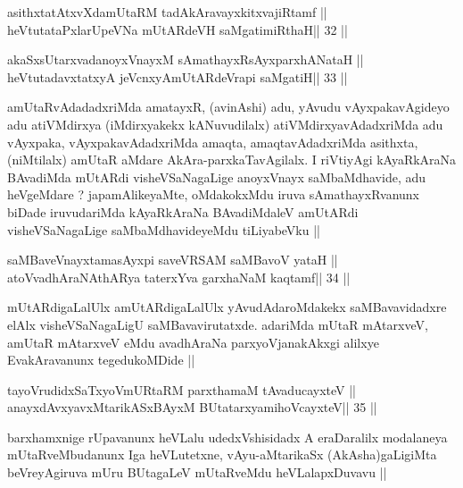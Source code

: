 \begin{shl}
asithxtatAtxvXdamUtaRM tadAkAravayxkitxvajiRtamf ||
heVtutataPxlarUpeVNa mUtARdeVH saMgatimiRthaH\hfill || 32 ||
\end{shl}

\begin{shl}
akaSxsUtarxvadanoyxVnayxM sAmathayxRsAyxparxhANataH ||
heVtutadavxtatxyA jeVcnxyA\s mUtARdeVrapi saMgatiH\hfill || 33 ||
\end{shl}

\begin{artha}
amUtaRvAdadadxriMda amatayxR, (avinAshi) adu, yAvudu vAyxpakavAgideyo
adu atiVMdirxya (iMdirxyakekx kANuvudilalx) atiVMdirxyavAdadxriMda
adu vAyxpaka, vAyxpakavAdadxriMda amaqta, amaqtavAdadxriMda asithxta,
(niMtilalx) amUtaR aMdare AkAra-parxkaTavAgilalx. I riVtiyAgi
kAyaRkAraNa BAvadiMda mUtARdi visheVSaNagaLige anoyxVnayx saMbaMdhavide,
adu heVgeMdare ? japamAlikeyaMte, oMdakokxMdu iruva sAmathayxRvanunx
biDade iruvudariMda kAyaRkAraNa BAvadiMdaleV amUtARdi visheVSaNagaLige
saMbaMdhavideyeMdu tiLiyabeVku ||
\end{artha}


\begin{shl}
saMBaveV\s nayxtamasAyxpi saveVRSAM saMBavoV yataH ||
atoV\s vadhAraNAthARya taterxYva garxhaNaM kaqtamf\hfill || 34 ||
\end{shl}

\begin{artha}
mUtARdigaLalUlx amUtARdigaLalUlx yAvudAdaroMdakekx saMBavavidadxre
elAlx visheVSaNagaLigU saMBavavirutatxde. adariMda mUtaR mAtarxveV,
amUtaR mAtarxveV eMdu avadhAraNa parxyoVjanakAkxgi alilxye
EvakAravanunx tegedukoMDide ||
\end{artha}



\begin{shl}
tayoVrudidxSaTxyoVmURtaRM parxthamaM tAvaducayxteV ||
anayxdAvxyavxMtarikASxBAyxM BUtatarxyamihoVcayxteV\hfill || 35 ||
\end{shl}

\begin{artha}
barxhamxnige rUpavanunx heVLalu udedxVshisidadx A eraDaralilx
modalaneya mUtaRveMbudanunx Iga heVLutetxne, vAyu-aMtarikaSx
(AkAsha)gaLigiMta beVreyAgiruva mUru BUtagaLeV mUtaRveMdu
heVLalapxDuvavu ||
\end{artha}

